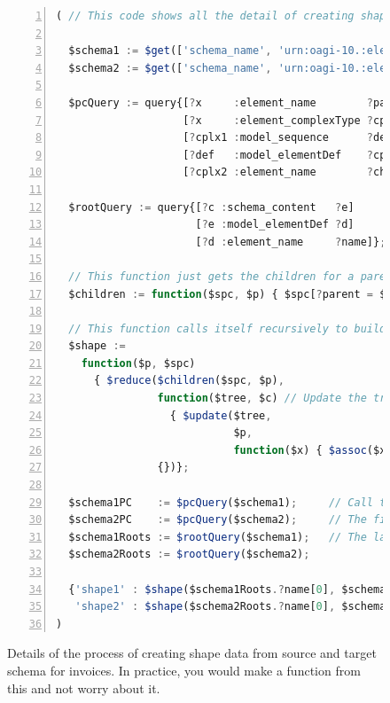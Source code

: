 \documentclass[10pt,letterpaper]{article} %
\begin{document}
\begin{figure}[H]
  \caption{Details of the process of creating shape data from source and target schema for invoices.
    In practice, you would make a function from this and not worry about it.}
  \label{fig:def-of-shape-fn}
\begin{lstlisting}[language=JavaScript,numberstyle=\scriptsize,basicstyle=\ttfamily\scriptsize,numbers=left,stepnumber=1,breaklines=true]
( // This code shows all the detail of creating shapes for $llmMatch.

  $schema1 := $get(['schema_name', 'urn:oagi-10.:elena.2023-07-02.ProcessInvoice-BC_1_v2'], ['schema_content']);
  $schema2 := $get(['schema_name', 'urn:oagi-10.:elena.2023-07-02.ProcessInvoice-BC_2_v2'], ['schema_content']);

  $pcQuery := query{[?x     :element_name        ?parent] // pc = 'parent/child'
                    [?x     :element_complexType ?cplx1]
                    [?cplx1 :model_sequence      ?def]
                    [?def   :model_elementDef    ?cplx2]
                    [?cplx2 :element_name        ?child]};

  $rootQuery := query{[?c :schema_content   ?e]
                      [?e :model_elementDef ?d]
                      [?d :element_name     ?name]};

  // This function just gets the children for a parent.
  $children := function($spc, $p) { $spc[?parent = $p].?child };

  // This function calls itself recursively to build the schema shape, starting from the root.
  $shape :=
    function($p, $spc)
      { $reduce($children($spc, $p),
                function($tree, $c) // Update the tree.
                  { $update($tree,
                            $p,
                            function($x) { $assoc($x, $c, $lookup($shape($c, $spc), $c) or '<data>')}) },
                {})};

  $schema1PC    := $pcQuery($schema1);     // Call the two queries with the two schema.
  $schema2PC    := $pcQuery($schema2);     // The first two return binding sets for {?parent x ?child y}
  $schema1Roots := $rootQuery($schema1);   // The last two return binding sets for {?name} (of a root).
  $schema2Roots := $rootQuery($schema2);

  {'shape1' : $shape($schema1Roots.?name[0], $schema1PC),
   'shape2' : $shape($schema2Roots.?name[0], $schema2PC)}
)
\end{lstlisting}
\end{figure} \vspace{-3em}
\end{document}
